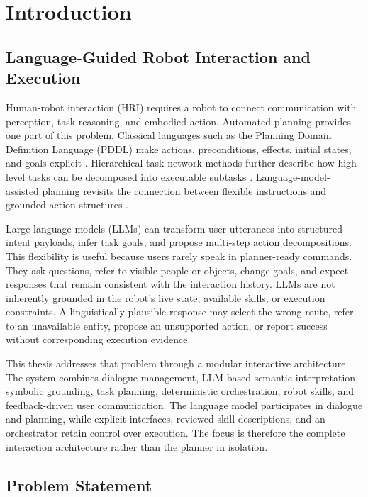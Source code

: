 \chapter{Introduction}
\label{chap:introduction}

\section{Language-Guided Robot Interaction and Execution}

Human-robot interaction (HRI) requires a robot to connect communication with perception, task reasoning, and embodied action. Automated planning provides one part of this problem. Classical languages such as the Planning Domain Definition Language (PDDL) make actions, preconditions, effects, initial states, and goals explicit \parencite{mcdermott1998pddl}. Hierarchical task network methods further describe how high-level tasks can be decomposed into executable subtasks \parencite{erol1994htn,nau2003shop2,georgievski2014htn}. Language-model-assisted planning revisits the connection between flexible instructions and grounded action structures \parencite{liu2023llmp,valmeekam2023planning,ahn2022saycan}.

Large language models (LLMs) can transform user utterances into structured intent payloads, infer task goals, and propose multi-step action decompositions. This flexibility is useful because users rarely speak in planner-ready commands. They ask questions, refer to visible people or objects, change goals, and expect responses that remain consistent with the interaction history. LLMs are not inherently grounded in the robot's live state, available skills, or execution constraints. A linguistically plausible response may select the wrong route, refer to an unavailable entity, propose an unsupported action, or report success without corresponding execution evidence.

This thesis addresses that problem through a modular interactive architecture. The system combines dialogue management, LLM-based semantic interpretation, symbolic grounding, task planning, deterministic orchestration, robot skills, and feedback-driven user communication. The language model participates in dialogue and planning, while explicit interfaces, reviewed skill descriptions, and an orchestrator retain control over execution. The focus is therefore the complete interaction architecture rather than the planner in isolation.

\section{Problem Statement}

